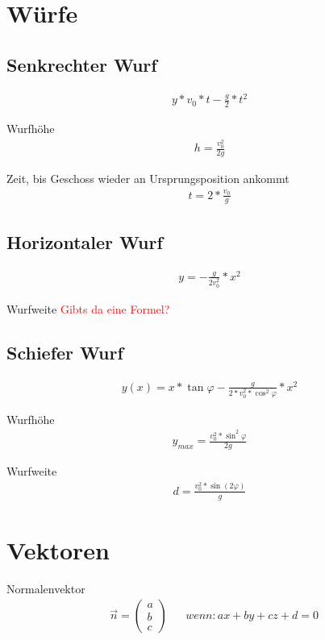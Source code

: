 \documentclass[17pt]{extarticle}
\begin{document}
	\section{Würfe}

	\subsection{Senkrechter Wurf}
	\begin{align}
		y * v_{0} * t - \frac{g}{2} * t^{2}
	\end{align}
	
	Wurfhöhe
	\begin{align}
		h = \frac{v_{0}^{2}}{2g}
	\end{align}
	
	Zeit, bis Geschoss wieder an Ursprungsposition ankommt
	\begin{align}
		t = 2 * \frac{v_{0}}{g} 
	\end{align}
	\subsection{Horizontaler Wurf}
	\begin{align}
		y = - \frac{g}{2v_{0}^{2}} * x^{2}
	\end{align}
	
	Wurfweite
	\textcolor{red}{Gibts da eine Formel?}
	
	\subsection{Schiefer Wurf}
	\begin{align}
		y(x) = x * \tan \varphi - \frac{g}{2 * v_{0}^{2} * \cos^{2} \varphi} * x^{2}
	\end{align}
	
	Wurfhöhe
	\begin{align}
		y_{max} = \frac{v_{0}^{2} * \sin^{2} \varphi}{2g}
	\end{align}
	
	Wurfweite
	\begin{align}
		d = \frac{v_{0}^{2} * \sin(2\varphi)}{g}
	\end{align}


\section{Vektoren}
	Normalenvektor
	\begin{align}
		&\vec{n} =
		\begin{pmatrix} a \\ b \\ c \end{pmatrix}		
		&&wenn: ax + by + cz + d = 0
	\end{align}
	
\end{document}
